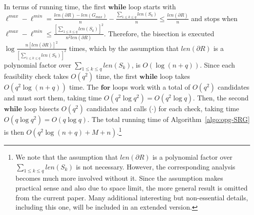 \begin{algorithm}[H]
\begin{small}
		\vspace{0.025in}
		
		\caption{\algoSRG} \label{algo:opg-SRG}
	\end{small}
\end{algorithm}

In terms of running time, the first $\mathbf{while}$ loop starts with 
$\ell^{max} - \ell^{min} = \frac{len(\partial R) -  len(G_{max})}{n} -
\frac{\sum_{1\le k\le q}len(S_k)}{n} \le \frac{len(\partial R)}{n}$ and 
stops when $\ell^{max} - \ell^{min} \le 
\frac{[\sum_{1\le k\le q}len(S_k)]^2}{n^2len(\partial R)}$. Therefore, 
the bisection is executed 
$\log \frac{n[len(\partial R)]^2}{[\sum_{1\le k\le q}len(S_k)]^2}$ times, 
which by the assumption that $len(\partial R)$ is a polynomial factor over 
$\sum_{1\le k\le q}len(S_k)$, is $O(\log (n + q))$. Since each feasibility 
check takes $O(q^2)$ time, the first $\mathbf{while}$ loop takes 
$O(q^2\log(n + q))$ time. The $\mathbf{for}$ loops work with a total of 
$O(q^2)$ candidates and must sort them, taking time $O(q^2 \log q^2) = 
O(q^2 \log q)$. Then, the second $\mathbf{while}$ loop bisects $O(q^2)$ 
candidates and calls \isLFeasibleByTilingPartial($\cdot$) for each check, 
taking time $O(q\log q^2) = O(q\log q)$. The total running time of 
Algorithm~\ref{algo:opg-SRG} is then $O(q^2\log (n + q) + M + n)$.\footnote{We note that 
the assumption that $len(\partial R)$ is a polynomial factor over 
$\sum_{1\le k\le q}len(S_k)$ is not necessary. However, the corresponding 
analysis becomes much more involved without it. Since the assumption makes 
practical sense and also due to space limit, the more general result is 
omitted from the current paper. Many additional interesting but 
non-essential details, including this one, will be included in an extended 
version.}
